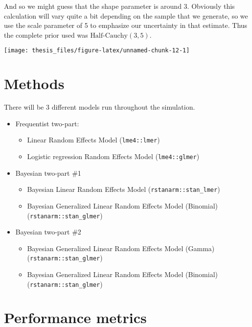 \documentclass[12pt,twoside]{reedthesis}
\providecommand{\tightlist}{%
  \setlength{\itemsep}{0pt}\setlength{\parskip}{0pt}}
\begin{document}
And so we might guess that the shape parameter is around 3. Obviously this calculation will vary quite a bit depending on the sample that we generate, so we use the scale parameter of 5 to emphasize our uncertainty in that estimate. Thus the complete prior used was \(\text{Half-Cauchy}(3, 5)\).
\begin{center}\texttt{[image: thesis\_files/figure-latex/unnamed-chunk-12-1]} \end{center}

\hypertarget{methods}{%
\section{Methods}\label{methods}}

There will be 3 different models run throughout the simulation.
\begin{itemize}
\tightlist
\item
  Frequentist two-part:
  \begin{itemize}
  \tightlist
  \item
    Linear Random Effects Model (\texttt{lme4::lmer})
  \item
    Logistic regression Random Effects Model (\texttt{lme4::glmer})
  \end{itemize}
\item
  Bayesian two-part \#1
  \begin{itemize}
  \tightlist
  \item
    Bayesian Linear Random Effects Model (\texttt{rstanarm::stan\_lmer})
  \item
    Bayesian Generalized Linear Random Effects Model (Binomial) (\texttt{rstanarm::stan\_glmer})
  \end{itemize}
\item
  Bayesian two-part \#2
  \begin{itemize}
  \tightlist
  \item
    Bayesian Generalized Linear Random Effects Model (Gamma) (\texttt{rstanarm::stan\_glmer})
  \item
    Bayesian Generalized Linear Random Effects Model (Binomial) (\texttt{rstanarm::stan\_glmer})
  \end{itemize}
\end{itemize}
\hypertarget{performance-metrics}{%
\section{Performance metrics}\label{performance-metrics}}
\end{document}
